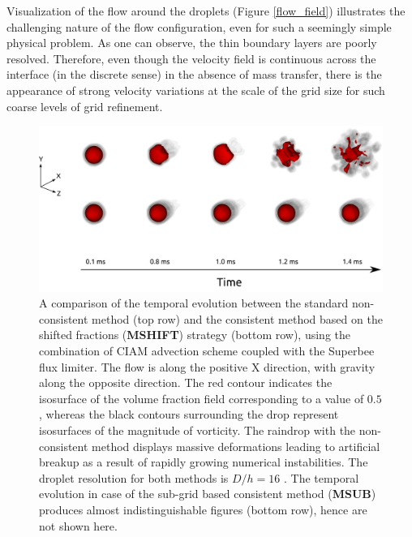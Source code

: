 Visualization of the flow around the droplets (Figure \ref{flow_field}) 
illustrates the challenging nature of the flow configuration, 
even for such a seemingly simple physical problem. 
As one can observe, the thin boundary layers are poorly resolved. 
Therefore, even though the velocity field is continuous across the 
interface (in the discrete sense) in the absence of mass transfer, 
there is the appearance of strong velocity variations at the 
scale of the grid size for such coarse levels of grid refinement. 

\begin{figure}
\begin{center}
\includegraphics[width=1.25\textwidth]{plots/raindrop/raindrop_explode.png}
\end{center}
\caption{A comparison of the temporal evolution between the standard 
non-consistent method (top row) and the consistent method based on the 
shifted fractions (\textbf{MSHIFT}) strategy (bottom row), 
using the combination of CIAM advection scheme coupled with the Superbee flux limiter. 
The flow is along the positive X direction, with gravity along the opposite direction. 
The red contour indicates the isosurface of the volume fraction 
field corresponding to a value of $0.5$, whereas the black contours 
surrounding the drop represent isosurfaces of the magnitude of vorticity. 
The raindrop with the non-consistent method displays massive deformations 
leading to artificial breakup as a result of rapidly growing numerical instabilities. 
The droplet resolution for both methods is $D/h = 16$ .
The temporal evolution in case of the sub-grid based consistent method (\textbf{MSUB}) produces 
almost indistinguishable figures (bottom row), hence are not shown here.}
\label{explode_compare}
\end{figure}



